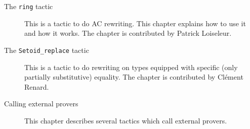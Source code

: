\begin{description}
\item[The {\tt ring} tactic] This is a tactic to do AC rewriting. This
  chapter explains how to use it and how it works.
  The chapter is contributed by Patrick Loiseleur.

\item[The {\tt Setoid\_replace} tactic] This is a
  tactic to do rewriting on types equipped with specific (only partially
  substitutive) equality. The chapter is contributed by Clément Renard.

\item[Calling external provers] This chapter describes several tactics
  which call external provers.

\end{description}

\atableofcontents


